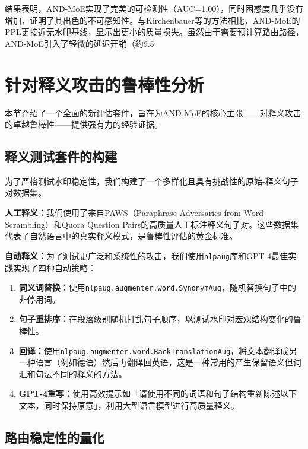 \documentclass[letterpaper,twocolumn,10pt]{article}
\begin{document}
结果表明，AND-MoE实现了完美的可检测性（AUC=1.00），同时困惑度几乎没有增加，证明了其出色的不可感知性。与Kirchenbauer等的方法相比，AND-MoE的PPL更接近无水印基线，显示出更小的质量损失。虽然由于需要预计算路由路径，AND-MoE引入了轻微的延迟开销（约9.5%

\section{针对释义攻击的鲁棒性分析}

本节介绍了一个全面的新评估套件，旨在为AND-MoE的核心主张——对释义攻击的卓越鲁棒性——提供强有力的经验证据。

\subsection{释义测试套件的构建}

为了严格测试水印稳定性，我们构建了一个多样化且具有挑战性的原始-释义句子对数据集。

\textbf{人工释义：}我们使用了来自PAWS（Paraphrase Adversaries from Word Scrambling）\cite{zhang2019paws}和Quora Question Pairs\cite{quora2017}的高质量人工标注释义句子对。这些数据集代表了自然语言中的真实释义模式，是鲁棒性评估的黄金标准。

\textbf{自动释义：}为了测试更广泛和系统性的攻击，我们使用\verb|nlpaug|库\cite{nlpaug2019}和GPT-4最佳实践实现了四种自动策略：

\begin{enumerate}
\item \textbf{同义词替换：}使用\verb|nlpaug.augmenter.word.SynonymAug|，随机替换句子中的非停用词。
\item \textbf{句子重排序：}在段落级别随机打乱句子顺序，以测试水印对宏观结构变化的鲁棒性。
\item \textbf{回译：}使用\verb|nlpaug.augmenter.word.BackTranslationAug|，将文本翻译成另一种语言（例如德语）然后再翻译回英语，这是一种常用的产生保留语义但词汇和句法不同的释义的方法。
\item \textbf{GPT-4重写：}使用高效提示如「请使用不同的词语和句子结构重新陈述以下文本，同时保持原意」，利用大型语言模型进行高质量释义。
\end{enumerate}

\subsection{路由稳定性的量化}
\end{document}
